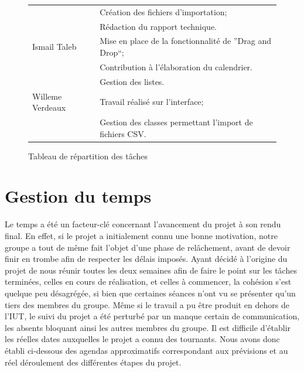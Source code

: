 \documentclass[a4paper,10pt]{report}
\begin{document}
\begin{figure}[H]
{\begin{tabular}{|l|l|}
	      & Création des fichiers d'importation;\\
	      & Rédaction du rapport technique.\\
	      \hline
	      Ismail Taleb 
	      & Mise en place de la fonctionnalité de ''Drag and Drop``; \\
	      & Contribution à l'élaboration du calendrier.\\
	      & Gestion des listes.\\
	      \hline
	      Willeme Verdeaux 
	      & Travail réalisé sur l'interface; \\
	      & Gestion des classes permettant l'import de fichiers CSV.\\
	    \hline
	  \end{tabular}
	  \hss}
	  \caption{Tableau de répartition des tâches}
      \end{figure}
      
      
  \chapter{Gestion du temps}
    Le temps a été un facteur-clé concernant l'avancement du projet à son rendu final.
    En effet, si le projet a initialement connu une bonne motivation, notre groupe a tout de même fait l'objet d'une phase de relâchement, avant de devoir finir en trombe afin de respecter les délais imposés.
    Ayant décidé à l'origine du projet de nous réunir toutes les deux semaines afin de faire le point sur les tâches terminées, celles en cours de réalisation, et celles à commencer, la cohésion s'est quelque peu désagrégée, si bien que certaines séances n'ont vu se présenter qu'un tiers des membres du groupe.
    Même si le travail a pu être produit en dehors de l'IUT, le suivi du projet a été perturbé par un manque certain de communication, les absents bloquant ainsi les autres membres du groupe.
    Il est difficile d'établir les réelles dates auxquelles le projet a connu des tournants.
    Nous avons donc établi ci-dessous des agendas approximatifs correspondant aux prévisions et au réel déroulement des différentes étapes du projet.
    
\end{document}
